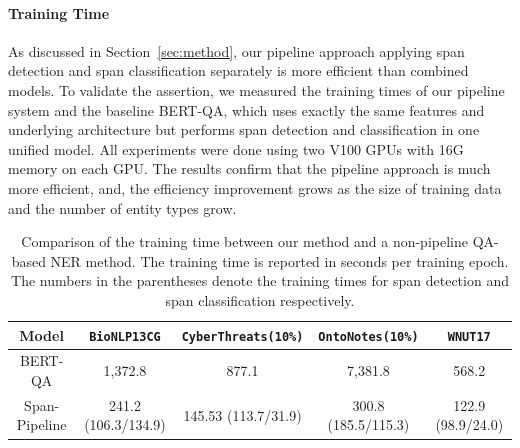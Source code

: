 \paragraph{Training Time}
As discussed in Section~\ref{sec:method}, our pipeline approach applying span detection  and span classification separately is more efficient than combined models.
To validate the assertion, we measured the training times of our pipeline system
and the baseline BERT-QA, which uses exactly the same features and underlying architecture but performs span detection and classification in one unified model.
All experiments were done using two V100 GPUs with 16G memory on each GPU. 
The results confirm that the pipeline approach is much more efficient,
and, the efficiency improvement grows as the size of training data and 
the number of entity types grow.
\begin{table}[h!]
\centering
\begin{small}
\begin{tabular}{ccccc}\toprule
 \textbf{Model} & \texttt{BioNLP13CG} & \texttt{CyberThreats(10\%)} & \texttt{OntoNotes(10\%)} & \texttt{WNUT17} \\ \toprule 
BERT-QA                & 1,372.8 & 877.1 &  7,381.8   & 568.2\\
Span-Pipeline     & 241.2 (106.3/134.9) & 145.53 (113.7/31.9) & 300.8 (185.5/115.3)  & 122.9 (98.9/24.0)\\
\bottomrule
\end{tabular}
\caption{Comparison of the training time between our method and a non-pipeline QA-based NER method. 
    The training time is reported in seconds per training epoch. The numbers in the parentheses denote the training times for span detection and span classification respectively. }
\label{tab:train_time_ablation}
\end{small}
\end{table}

